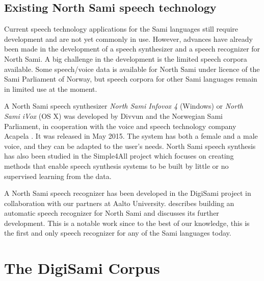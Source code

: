 \documentclass[runningheads,a4paper]{llncs}
\begin{document}
\subsection{Existing North Sami speech technology}

Current speech technology applications for the Sami languages still require development and are not yet commonly in use. However, advances have already been made in the development of a speech synthesizer and a speech recognizer for North Sami. A big challenge in the development is the limited speech corpora available. Some speech/voice data is available for North Sami under licence of the Sami Parliament of Norway, but speech corpora for other Sami languages remain in limited use at the moment.

A North Sami speech synthesizer \textit{North Sami Infovox 4} (Windows) or \textit{North Sami iVox} (OS X) was developed by Divvun and the Norwegian Sami Parliament, in cooperation with the voice and speech technology company Acapela \cite{Tromso:tale}.
It was released in May 2015. The system has both a female and a male voice, and they can be adapted to the user's needs. North Sami speech synthesis has also been studied in the Simple4All project \cite{Simple4All}
which focuses on creating methods that enable speech synthesis systems to be built by little or no supervised learning from the data.

A North Sami speech recognizer has been developed in the DigiSami project in collaboration with our partners at Aalto University. \cite{Leinonen:15} describes building an automatic speech recognizer for North Sami and discusses its further development. This is a notable work since to the best of our knowledge, this is the first and only speech recognizer for any of the Sami languages today.


\section{The DigiSami Corpus}
\label{sec:digisami-corpus}
\end{document}
